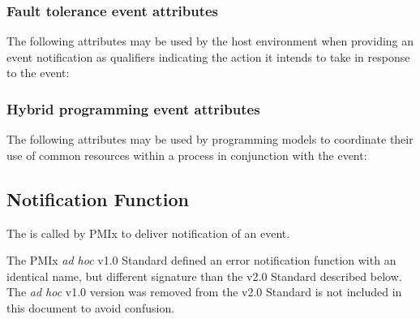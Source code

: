 \subsubsection{Fault tolerance event attributes}
\label{api:struct:attributes:ft}

The following attributes may be used by the host environment when providing an event notification as qualifiers indicating the action it intends to take in response to the event:

%
%
%
%
%

\subsubsection{Hybrid programming event attributes}
\label{api:struct:attributes:hybrid}

The following attributes may be used by programming models to coordinate their use of common resources within a process in conjunction with the  event:
%

\subsection{Notification Function}

\summary

The  is called by \ac{PMIx} to deliver notification of an event.

\adviceuserstart
The \ac{PMIx} \textit{ad hoc} v1.0 Standard defined an error notification function with an identical name, but different signature than the v2.0 Standard described below. The \textit{ad hoc} v1.0 version was removed from the v2.0 Standard is not included in this document to avoid confusion.
\adviceuserend


